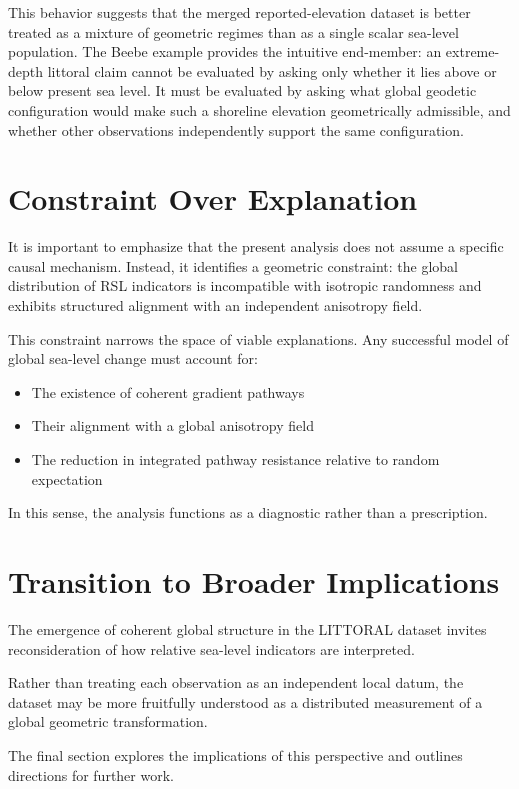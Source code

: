 \documentclass[twocolumn,10pt]{article}
\begin{document}
This behavior suggests that the merged reported-elevation dataset is better treated as a mixture of geometric regimes than as a single scalar sea-level population. The Beebe example provides the intuitive end-member: an extreme-depth littoral claim cannot be evaluated by asking only whether it lies above or below present sea level. It must be evaluated by asking what global geodetic configuration would make such a shoreline elevation geometrically admissible, and whether other observations independently support the same configuration.

\section{Constraint Over Explanation}

It is important to emphasize that the present analysis does not assume a specific causal mechanism. Instead, it identifies a geometric constraint: the global distribution of RSL indicators is incompatible with isotropic randomness and exhibits structured alignment with an independent anisotropy field.

This constraint narrows the space of viable explanations. Any successful model of global sea-level change must account for:

\begin{itemize}
\item The existence of coherent gradient pathways
\item Their alignment with a global anisotropy field
\item The reduction in integrated pathway resistance relative to random expectation
\end{itemize}

In this sense, the analysis functions as a diagnostic rather than a prescription.

\section{Transition to Broader Implications}

The emergence of coherent global structure in the LITTORAL dataset invites reconsideration of how relative sea-level indicators are interpreted.

Rather than treating each observation as an independent local datum, the dataset may be more fruitfully understood as a distributed measurement of a global geometric transformation.

The final section explores the implications of this perspective and outlines directions for further work.
\end{document}

